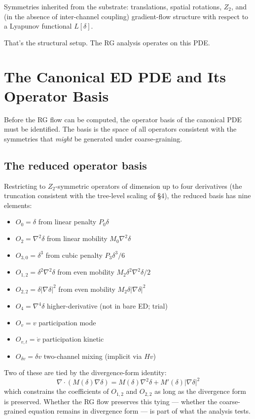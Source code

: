 \documentclass[11pt,a4paper]{article}
\begin{document}
Symmetries inherited from the substrate: translations, spatial rotations, $Z_2$, and (in the absence of inter-channel coupling) gradient-flow structure with respect to a Lyapunov functional $L[\delta]$.

That's the structural setup. The RG analysis operates on this PDE.

\section{The Canonical ED PDE and Its Operator Basis}

Before the RG flow can be computed, the operator basis of the canonical PDE must be identified. The basis is the space of all operators consistent with the symmetries that \emph{might} be generated under coarse-graining.

\subsection{The reduced operator basis}

Restricting to $Z_2$-symmetric operators of dimension up to four derivatives (the truncation consistent with the tree-level scaling of \S4), the reduced basis has nine elements:

\begin{itemize}[noitemsep]
\item $O_0 = \delta$ \quad from linear penalty $P_0 \delta$
\item $O_2 = \nabla^{2}\delta$ \quad from linear mobility $M_0 \nabla^{2}\delta$
\item $O_{3,0} = \delta^{3}$ \quad from cubic penalty $P_3 \delta^{3}/6$
\item $O_{1,2} = \delta^{2}\nabla^{2}\delta$ \quad from even mobility $M_2 \delta^{2} \nabla^{2}\delta / 2$
\item $O_{2,2} = \delta|\nabla \delta|^{2}$ \quad from even mobility $M_2 \delta|\nabla \delta|^{2}$
\item $O_4 = \nabla^{4}\delta$ \quad higher-derivative (not in bare ED; trial)
\item $O_v = v$ \quad participation mode
\item $O_{v,t} = \dot v$ \quad participation kinetic
\item $O_{\delta v} = \delta v$ \quad two-channel mixing (implicit via $Hv$)
\end{itemize}

Two of these are tied by the divergence-form identity:
\[
\nabla \cdot (M(\delta) \nabla \delta) = M(\delta) \nabla^{2}\delta + M'(\delta) |\nabla \delta|^{2}
\]
which constrains the coefficients of $O_{1,2}$ and $O_{2,2}$ as long as the divergence form is preserved. Whether the RG flow preserves this tying --- whether the coarse-grained equation remains in divergence form --- is part of what the analysis tests.
\end{document}
